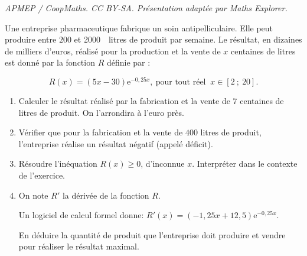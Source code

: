 \documentclass[10pt]{article}
\providecommand{\np}[2][]{{#2~#1}}
\begin{document}
\noindent\textit{APMEP / CoopMaths. CC BY-SA. Présentation adaptée par Maths Explorer.}\par\medskip
\medskip

Une entreprise pharmaceutique fabrique un soin antipelliculaire. Elle peut produire entre $200$ et \np{2000}~litres de produit par semaine. Le résultat, en dizaines de milliers d'euros, réalisé pour la production et la vente de $x$ centaines de litres est donné par la fonction $R$ définie par :

\[R(x) = (5x - 30)\text{e}^{-0,25x},\:  \text{pour tout réel }\: x \in  [2~;~20].\]

\smallskip

\begin{enumerate}
\item Calculer le résultat réalisé par la fabrication et la vente de $7$ centaines de litres de produit. On l'arrondira à l'euro près.
\item  Vérifier que pour la fabrication et la vente de $400$ litres de produit, l'entreprise réalise un résultat négatif (appelé déficit).
\item  Résoudre l'inéquation $R(x) \geqslant 0$, d'inconnue $x$. Interpréter dans le contexte de l'exercice.
\item  On note $R'$ la dérivée de la fonction $R$.

Un logiciel de calcul formel donne: $R'(x) = (- 1,25x + 12,5)\text{e}^{-0,25x}$.

En déduire la quantité de produit que l'entreprise doit produire et vendre pour réaliser le résultat maximal.
\end{enumerate}

\bigskip
\end{document}
